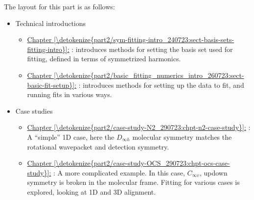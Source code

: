 \documentclass[letterpaper,table,10pt,english]{jupyterBook}
\begin{document}
\sphinxAtStartPar
The layout for this part is as follows:
\begin{itemize}
\item {} 
\sphinxAtStartPar
Technical introductions
\begin{itemize}
\item {} 
\sphinxAtStartPar
\hyperref[\detokenize{part2/sym-fitting-intro_240723:sect-basis-sets-fitting-intro}]{Chapter \ref{\detokenize{part2/sym-fitting-intro_240723:sect-basis-sets-fitting-intro}}:} {\hyperref[\detokenize{part2/sym-fitting-intro_240723:sect-basis-sets-fitting-intro}]{}}: introduces methods for setting the basis set used for fitting, defined in terms of symmetrized harmonics.

\item {} 
\sphinxAtStartPar
\hyperref[\detokenize{part2/basic_fitting_numerics_intro_260723:sect-basic-fit-setup}]{Chapter \ref{\detokenize{part2/basic_fitting_numerics_intro_260723:sect-basic-fit-setup}}:} {\hyperref[\detokenize{part2/basic_fitting_numerics_intro_260723:sect-basic-fit-setup}]{}}: introduces methods for setting up the data to fit, and running fits in various ways.

\end{itemize}

\item {} 
\sphinxAtStartPar
Case studies
\begin{itemize}
\item {} 
\sphinxAtStartPar
\hyperref[\detokenize{part2/case-study-N2_290723:chpt-n2-case-study}]{Chapter \ref{\detokenize{part2/case-study-N2_290723:chpt-n2-case-study}}:} {\hyperref[\detokenize{part2/case-study-N2_290723:chpt-n2-case-study}]{}}: A “simple” 1D case, here the \(D_{\infty h}\) molecular symmetry matches the rotational wavepacket and detection symmetry.

\item {} 
\sphinxAtStartPar
\hyperref[\detokenize{part2/case-study-OCS_290723:chpt-ocs-case-study}]{Chapter \ref{\detokenize{part2/case-study-OCS_290723:chpt-ocs-case-study}}:} {\hyperref[\detokenize{part2/case-study-OCS_290723:chpt-ocs-case-study}]{}}: A more complicated example. In this case, \(C_{\infty v}\), up\sphinxhyphen{}down symmetry is broken in the molecular frame. Fitting for various cases is explored, looking at 1D and 3D alignment.


\end{itemize}
\end{itemize}
\end{document}
